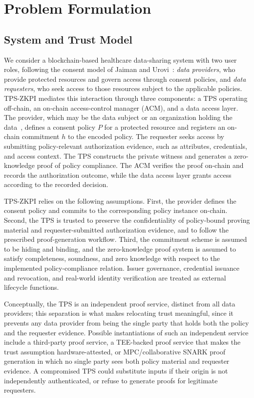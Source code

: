 \section{Problem Formulation}
\label{sec:problem}

\subsection{System and Trust Model}
\label{subsec:trust-model}

We consider a blockchain-based healthcare data-sharing system with two user roles, following the consent model of Jaiman and Urovi~\cite{jaiman2020consent}: \textit{data providers}, who provide protected resources and govern access through consent policies, and \textit{data requesters}, who seek access to those resources subject to the applicable policies.
TPS-ZKPI mediates this interaction through three components: a TPS operating off-chain, an on-chain access-control manager (ACM), and a data access layer.
The provider, which may be the data subject or an organization holding the data~\cite{jaiman2020consent}, defines a consent policy $P$ for a protected resource and registers an on-chain commitment $h$ to the encoded policy.
The requester seeks access by submitting policy-relevant authorization evidence, such as attributes, credentials, and access context.
The TPS constructs the private witness and generates a zero-knowledge proof
of policy compliance.
The ACM verifies the proof on-chain and records the authorization outcome, while the data access layer grants access according to the recorded decision.

TPS-ZKPI relies on the following assumptions.
First, the provider defines the consent policy and commits to the corresponding policy instance on-chain.
Second, the TPS is trusted to preserve the confidentiality of policy-bound proving material and requester-submitted authorization evidence, and to follow the prescribed proof-generation workflow.
Third, the commitment scheme is assumed to be hiding and binding, and the zero-knowledge proof system is assumed to satisfy completeness, soundness, and zero knowledge with respect to the implemented policy-compliance relation.
Issuer governance, credential issuance and revocation, and real-world identity verification are treated as external lifecycle functions.

Conceptually, the TPS is an independent proof service, distinct from all data providers; this separation is what makes relocating trust meaningful, since it prevents any data provider from being the single party that holds both the policy and the requester evidence. Possible instantiations of such an independent service include a third-party proof service, a TEE-backed proof service that makes the trust assumption hardware-attested, or MPC/collaborative SNARK proof generation in which no single party sees both policy material and requester evidence.
A compromised TPS could substitute inputs if their origin is not independently authenticated, or refuse to generate proofs for legitimate requesters.

